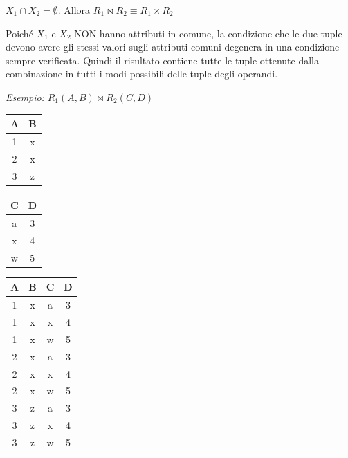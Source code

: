 \documentclass{article}
\begin{document}
\begin{itemize}
{{\item $X_1 \cap X_2 = \emptyset$. Allora $R_1 \bowtie R_2 \equiv R_1 \times R_2$

Poiché $X_1$ e $X_2$ NON hanno attributi in comune, la condizione che le due tuple devono avere gli stessi valori sugli attributi comuni degenera in una condizione sempre verificata. Quindi il risultato contiene tutte le tuple ottenute dalla combinazione in tutti i modi possibili delle tuple degli operandi. 

\textit{Esempio:} $R_1(A,B) \bowtie R_2(C,D)$

\begin{minipage}{.25\textwidth}
  \centering
    \begin{tabular}{|c|c|}
        \hline
        \textbf{A} & \textbf{B} \\
        \hline
        1 & x \\
        \hline
        2 &  x \\
        \hline
        3 & z \\
         \hline
        \end{tabular}
\end{minipage}%
\hfill
\begin{minipage}{.25\textwidth}
  \centering
       \begin{tabular}{|c|c|}
        \hline
        \textbf{C} & \textbf{D} \\
        \hline
        a & 3\\
        \hline
        x & 4\\
         \hline
         w & 5 \\
         \hline
        \end{tabular}
\end{minipage}
\hfill
\begin{minipage}{.25\textwidth}
  \centering
\begin{tabular}{|c|c|c|c|}
        \hline
        \textbf{A} & \textbf{B} & \textbf{C} & \textbf{D} \\
        \hline
        1 & x & a & 3 \\
        \hline
        1 & x & x & 4 \\
        \hline
        1 & x & w & 5 \\
        \hline
        2 & x & a & 3 \\
        \hline
        2 & x & x & 4 \\
        \hline
        2 & x & w & 5 \\
        \hline
        3 & z & a & 3 \\
        \hline
        3 & z & x & 4 \\
        \hline
        3 & z & w & 5 \\
        \hline
    \end{tabular}
\hspace{1em}
\end{minipage}


}}
\end{itemize}
\end{document}
